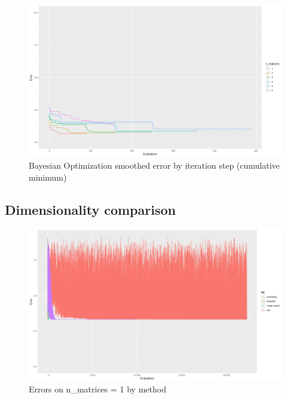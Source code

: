 \begin{figure}[!htb]
\centering
\includegraphics[width=\textwidth]{figures/alg_bayesian_smoothed}
\decoRule
\caption[Bayesian Optimization (smoothed)]{Bayesian Optimization smoothed error by iteration step (cumulative minimum)}
\label{fig:alg_bayesian_smoothed}
\end{figure}


\subsection{Dimensionality comparison}

\begin{figure}[!htb]
	\centering
	\includegraphics[width=\textwidth]{figures/n_1}
	\decoRule
	\caption[n=1]{Errors on n\_matrices = 1 by method}
	\label{fig:n_1}
\end{figure}

